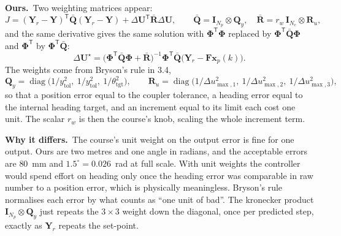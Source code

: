 \documentclass[11pt,a4paper]{article}
\newcommand{\vect}[1]{\bm{#1}}
\newcommand{\mat}[1]{\bm{#1}}
\newcommand{\T}{^{\mathsf{T}}}
\newcommand{\diag}{\operatorname{diag}}
\newcommand{\dU}{\Delta\vect{U}}
\newcommand{\Np}{N_p}
\newcommand{\Nc}{N_c}
\newcommand{\Qbar}{\bar{\mat{Q}}}
\newcommand{\Rbar}{\bar{\mat{R}}}
\newcommand{\ours}{\textbf{\textcolor{green!45!black}{Ours.}}\ }
\newcommand{\why}{\textbf{\textcolor{red!60!black}{Why it differs.}}\ }
\begin{document}
\ours Two weighting matrices appear:
\begin{equation}
J = (\vect Y_r - \vect Y)\T\Qbar(\vect Y_r - \vect Y) + \dU\T\Rbar\dU,\qquad
\Qbar = \mat I_{\Np}\otimes\mat Q_y,\quad
\Rbar = r_w\,\mat I_{\Nc}\otimes\mat R_u,
\end{equation}
and the same derivative gives the same solution with $\mat\Phi\T\mat\Phi$ replaced by $\mat\Phi\T\Qbar\mat\Phi$ and $\mat\Phi\T$ by $\mat\Phi\T\Qbar$:
\begin{equation}
\dU^\star = \big(\mat\Phi\T\Qbar\mat\Phi + \Rbar\big)^{-1}\mat\Phi\T\Qbar\big(\vect Y_r - \mat F\vect x_p(k)\big).
\end{equation}
The weights come from Bryson's rule in 3.4,
\begin{equation}
\mat Q_y = \diag\!\big(1/y_{\mathrm{tol}}^2,\ 1/y_{\mathrm{tol}}^2,\ 1/\theta_{\mathrm{tgt}}^2\big),\qquad
\mat R_u = \diag\!\big(1/\Delta u_{\max,1}^2,\ 1/\Delta u_{\max,2}^2,\ 1/\Delta u_{\max,3}^2\big),
\end{equation}
so that a position error equal to the coupler tolerance, a heading error equal to the internal heading target, and an increment equal to its limit each cost one unit. The scalar $r_w$ is then the course's knob, scaling the whole increment term.

\why The course's unit weight on the output error is fine for one output. Ours are two metres and one angle in radians, and the acceptable errors are $80$~mm and $1.5^\circ = 0.026$~rad at full scale. With unit weights the controller would spend effort on heading only once the heading error was comparable in raw number to a position error, which is physically meaningless. Bryson's rule normalises each error by what counts as ``one unit of bad''. The kronecker product $\mat I_{\Np}\otimes\mat Q_y$ just repeats the $3\times3$ weight down the diagonal, once per predicted step, exactly as $\vect Y_r$ repeats the set-point.
\end{document}
